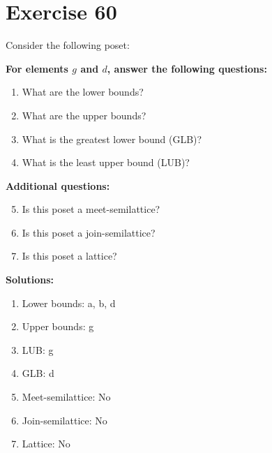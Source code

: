 \documentclass{article}
\begin{document}
\section*{Exercise 60}
Consider the following poset:
\begin{center}
\end{center}

    \textbf{For elements $g$ and $d$, answer the following questions:}
\begin{enumerate}
    \item What are the lower bounds?
    \item What are the upper bounds?
    \item What is the greatest lower bound (GLB)?
    \item What is the least upper bound (LUB)?
\end{enumerate}
    \hspace*{3ex} \textbf{Additional questions:}
\begin{enumerate}
    \setcounter{enumi}{4}
    \item Is this poset a meet-semilattice?
    \item Is this poset a join-semilattice?
    \item Is this poset a lattice?
\end{enumerate}

\textbf{Solutions:}
\begin{enumerate}
    \item Lower bounds: {a, b, d}
    \item Upper bounds: {g}
    \item LUB: g
    \item GLB: d
    \item Meet-semilattice: No
    \item Join-semilattice: No
    \item Lattice: No
\end{enumerate}
\newpage
\end{document}
